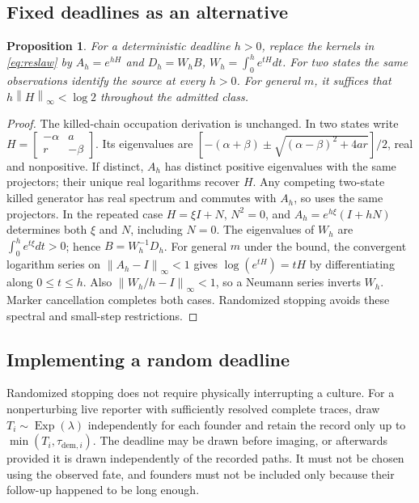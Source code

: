 \documentclass[11pt]{article}
\newtheorem{proposition}[theorem]{Proposition}
\theoremstyle{definition}
\newcommand{\norm}[1]{\left\lVert#1\right\rVert_\infty}
\begin{document}
\subsection{Fixed deadlines as an alternative}
\begin{proposition}\label{prop:fixed}
For a deterministic deadline $h>0$, replace the kernels in \eqref{eq:reslaw} by
$A_h=e^{hH}$ and $D_h=W_hB$, $W_h=\int_0^h e^{tH}dt$. For two states the same
observations identify the source at every $h>0$. For general $m$, it suffices
that $h\norm{H}<\log2$ throughout the admitted class.
\end{proposition}
\begin{proof}
The killed-chain occupation derivation is unchanged. In two states write
$H=\left[\begin{smallmatrix}-\alpha&a\\r&-\beta\end{smallmatrix}\right]$. Its
eigenvalues are $[-(\alpha+\beta)\pm\sqrt{(\alpha-\beta)^2+4ar}]/2$, real and
nonpositive. If distinct, $A_h$ has distinct positive eigenvalues with the same
projectors; their unique real logarithms recover $H$. Any competing two-state
killed generator has real spectrum and commutes with $A_h$, so uses the same
projectors. In the repeated case $H=\xi I+N$, $N^2=0$, and $A_h=e^{h\xi}(I+hN)$
determines both $\xi$ and $N$, including $N=0$. The eigenvalues of $W_h$ are
$\int_0^h e^{t\xi}dt>0$; hence $B=W_h^{-1}D_h$. For general $m$ under the bound,
the convergent logarithm series on $\norm{A_h-I}<1$ gives $\log(e^{tH})=tH$ by
differentiating along $0\le t\le h$. Also $\norm{W_h/h-I}<1$, so a Neumann
series inverts $W_h$. Marker cancellation completes both cases. Randomized
stopping avoids these spectral and small-step restrictions.
\end{proof}

\subsection{Implementing a random deadline}\label{sec:implement}
Randomized stopping does not require physically interrupting a culture. For a
nonperturbing live reporter with sufficiently resolved complete traces, draw
$T_i\sim\operatorname{Exp}(\lambda)$ independently for each founder and retain
the record only up to $\min(T_i,\tau_{\mathrm{dem},i})$. The deadline may be
drawn before imaging, or afterwards provided it is drawn independently of the
recorded paths. It must not be chosen using the observed fate, and founders must
not be included only because their follow-up happened to be long enough.
\end{document}

